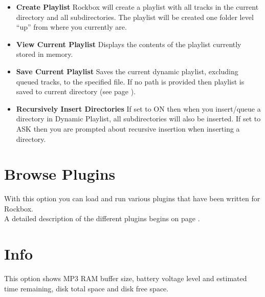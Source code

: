 \begin{itemize}
\item \textbf{Create Playlist}
  Rockbox will create a playlist with all tracks in the current directory and all subdirectories. The playlist will be created one folder level ``up'' from where you currently are.
  
\item \textbf{View Current Playlist}
  Displays the contents of the playlist currently stored in memory.
  
\item \textbf{Save Current Playlist}
  Saves the current dynamic playlist, excluding queued tracks, to the specified file. If no path is provided then playlist is saved to current directory (see page \pageref{ref:Playlistsubmenu}).
  
\item \textbf{Recursively Insert Directories}
  If set to ON then when you insert/queue a directory in Dynamic Playlist, all subdirectories will also be inserted. If set to ASK then you are prompted about recursive insertion when inserting a directory.
\end{itemize}

\section{Browse Plugins}
With this option you can load and run various plugins that have been written for Rockbox.\\

A detailed description of the different plugins begins on page \pageref{ref:Part5}.

\section{\label{ref:Info}Info}
This option shows MP3 RAM buffer size, battery voltage level and estimated time remaining, disk total space and disk free space.


